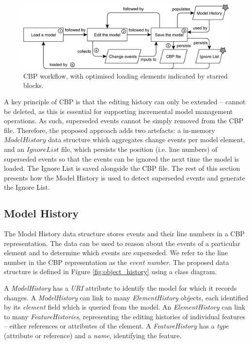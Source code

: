 \documentclass{llncs}
\begin{document}
    \vspace{-10pt}
    \begin{figure}[ht]
        \centering
        \includegraphics[width=\linewidth]{flowchart}
        \caption{CBP workflow, with optimised loading elements indicated by starred blocks.}
        \label{fig:flowchart}
    \end{figure}

    \vspace{-10pt}
    A key principle of CBP is that the editing history can only be extended -- cannot be deleted, as this is essential for supporting incremental model management operations. As such, superseded events cannot be simply removed from the CBP file. Therefore, the proposed approach adds two artefacts: a in-memory $Model History$ data structure which aggregates change events per model element, and an $Ignore List$ file, which persists the position (i.e. line numbers) of superseded events so that the events can be ignored the next time the model is loaded. The Ignore List is saved alongside the CBP file. The rest of this section presents how the Model History is used to detect superseded events and generate the Ignore List.
    
    \vspace{-10pt}
    \subsection{Model History}
    \label{subsec:model_history}
    The Model History data structure stores events and their line numbers in a CBP representation.  The data can be used to reason about the events of a particular element and to determine which events are superseded.  We refer to the line number in the CBP representation as the \emph{event number}. The proposed data structure is defined in Figure \ref{fig:object_history} using a class diagram.  
     
    A \emph{ModelHistory} has a \emph{URI} attribute to identify the model for which it records changes.  A \emph{ModelHistory} can link to many \emph{ElementHistory} objects, each identified by its \emph{element} field which is queried from the model. An \emph{ElementHistory} can link to many \emph{FeatureHistories}, representing the editing histories of individual features -- either references or attributes of the element. A \emph{FeatureHistory} has a \emph{type} (attribute or reference) and a \emph{name}, identifying the feature.
\end{document}
